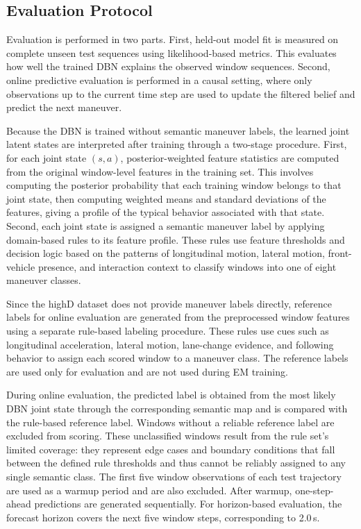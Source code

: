 \documentclass[upint,subscriptcorrection,varvw,hyphenate,balance,greek,russian,vietnamese,german]{asmeconf} %
\begin{document}
\subsection{Evaluation Protocol}
Evaluation is performed in two parts. 
First, held-out model fit is measured on complete unseen test sequences using likelihood-based metrics. 
This evaluates how well the trained DBN explains the observed window sequences. 
Second, online predictive evaluation is performed in a causal setting, where only observations up to the current time step are used to update the filtered belief and predict the next maneuver.

Because the DBN is trained without semantic maneuver labels, the learned joint latent states are interpreted after training through a two-stage procedure. 
First, for each joint state $(s, a)$, posterior-weighted feature statistics are computed from the original window-level features in the training set. 
This involves computing the posterior probability that each training window belongs to that joint state, then computing weighted means and standard deviations of the features, giving a profile of the typical behavior associated with that state. 
Second, each joint state is assigned a semantic maneuver label by applying domain-based rules to its feature profile. 
These rules use feature thresholds and decision logic based on the patterns of longitudinal motion, lateral motion, front-vehicle presence, and interaction context to classify windows into one of eight maneuver classes. 

Since the highD dataset does not provide maneuver labels directly, reference labels for online evaluation are generated from the preprocessed window features using a separate rule-based labeling procedure. 
These rules use cues such as longitudinal acceleration, lateral motion, lane-change evidence, and following behavior to assign each scored window to a maneuver class. 
The reference labels are used only for evaluation and are not used during EM training.

During online evaluation, the predicted label is obtained from the most likely DBN joint state through the corresponding semantic map and is compared with the rule-based reference label. 
Windows without a reliable reference label are excluded from scoring. 
These unclassified windows result from the rule set's limited coverage: they represent edge cases and boundary conditions that fall between the defined rule thresholds 
and thus cannot be reliably assigned to any single semantic class.
The first five window observations of each test trajectory are used as a warmup period and are also excluded. 
After warmup, one-step-ahead predictions are generated sequentially. 
For horizon-based evaluation, the forecast horizon covers the next five window steps, corresponding to 2.0\,s.
\end{document}
